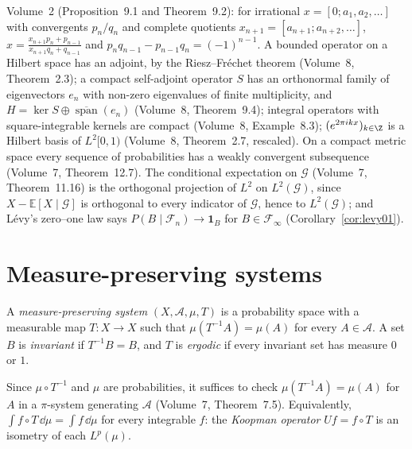 \begin{reminder}
Volume~2 (Proposition~9.1 and Theorem~9.2): for irrational $x=[0;a_1,a_2,\dots]$ with convergents $p_n/q_n$ and complete quotients $x_{n+1}=[a_{n+1};a_{n+2},\dots]$,
$x=\frac{x_{n+1}p_n+p_{n-1}}{x_{n+1}q_n+q_{n-1}}$ and $p_nq_{n-1}-p_{n-1}q_n=(-1)^{n-1}$. A bounded operator on a Hilbert space has an adjoint, by the Riesz--Fr\'echet theorem (Volume~8, Theorem~2.3); a compact self-adjoint operator $S$ has an orthonormal family of eigenvectors $e_n$ with non-zero eigenvalues of finite multiplicity, and $H=\ker S\oplus\overline{\operatorname{span}}(e_n)$ (Volume~8, Theorem~9.4);
integral operators with square-integrable kernels are compact (Volume~8, Example~8.3); $(e^{2\pi ikx})_{k\in\Z}$ is a Hilbert basis of $L^2[0,1)$ (Volume~8, Theorem~2.7, rescaled).
On a compact metric space every sequence of probabilities has a weakly convergent subsequence (Volume~7, Theorem~12.7). The conditional expectation on $\mathcal G$ (Volume~7, Theorem~11.16) is the orthogonal projection of $L^2$ on $L^2(\mathcal G)$, since $X-\mathbb E[X\mid\mathcal G]$ is orthogonal to every indicator of $\mathcal G$, hence to $L^2(\mathcal G)$;
and L\'evy's zero--one law says $P(B\mid\mathcal F_n)\to\mathbf 1_B$ for $B\in\mathcal F_\infty$ (Corollary~\ref{cor:levy01}).
\end{reminder}

\section{Measure-preserving systems}

\begin{definition}
A \emph{measure-preserving system} $(X,\mathcal A,\mu,T)$ is a probability space with a measurable map $T:X\to X$ such that $\mu(T^{-1}A)=\mu(A)$ for every $A\in\mathcal A$. A set $B$ is \emph{invariant} if
$T^{-1}B=B$, and $T$ is \emph{ergodic} if every invariant set has measure $0$ or $1$.
\end{definition}

Since $\mu\circ T^{-1}$ and $\mu$ are probabilities, it suffices to check $\mu(T^{-1}A)=\mu(A)$ for $A$ in a $\pi$-system generating $\mathcal A$ (Volume~7, Theorem~7.5). Equivalently, $\int f\circ T\,\dd\mu=\int f\,\dd\mu$ for every integrable $f$:
the \emph{Koopman operator} $Uf=f\circ T$ is an isometry of each $L^p(\mu)$.

